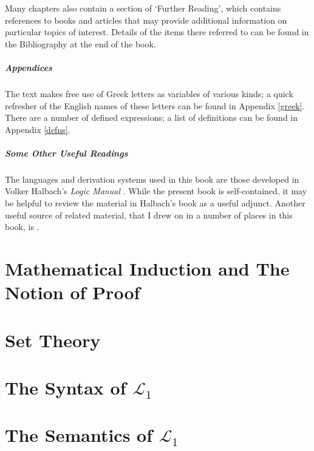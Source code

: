 \documentclass[openany,leqno,11pt]{book}
\theoremstyle{break}
\theoremstyle{definition}
\theoremstyle{remark}
\begin{document}
Many chapters also contain a section of `Further Reading', which contains references to books and articles that may provide additional information on particular topics of interest. Details of the items there referred to can be found in the Bibliography at the end of the book.

\paragraph{Appendices} The text makes free use of Greek letters as variables of various kinds; a quick refresher of the English names of these letters can be found in Appendix \ref{greek}. There are a number of defined expressions; a list of definitions can be found in Appendix \ref{defns}.

\paragraph{Some Other Useful Readings} The languages and derivation systems used in this book are those developed in Volker Halbach's \emph{Logic Manual} \citep{hallogma}. While the present book is self-contained, it may be helpful to review the material in Halbach's book as a useful adjunct. Another useful source of related material, that I drew on in a number of places in this book, is \citet{bosintlo}.  

\newpage

\chapter[Mathematical Induction and Proof]{Mathematical Induction and The Notion of Proof}\label{c1}
 

	\newpage
	\chapter{Set Theory}\label{c2}
	 
		\newpage
		
\chapter{The Syntax of $\mathcal{L}_{1}$}\label{c3}
	
\newpage

\chapter{The Semantics of $\mathcal{L}_{1}$}\label{c3a}
  
\newpage
\end{document}
